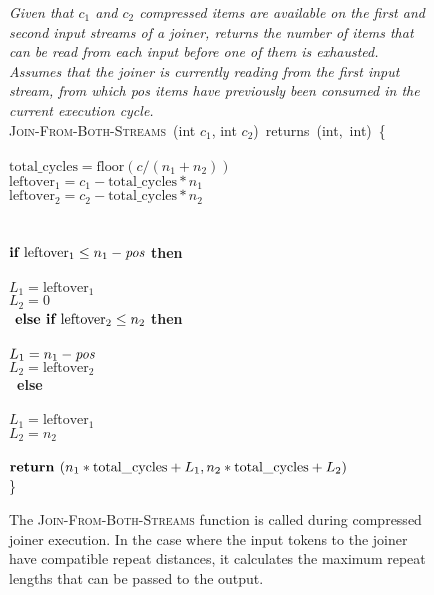 \begin{figure}[t!]
\centering
\begin{minipage}{0.75\textwidth}
{\it Given that $c_1$ and $c_2$ compressed items are available on the
  first and second input streams of a joiner, returns the number of
  items that can be read from each input before one of them is
  exhausted.  Assumes that the joiner is currently reading from the
  first input stream, from which \mbox{pos} items have previously been
  consumed in the current execution cycle.}\\
\textsc{Join-From-Both-Streams}~(int $c_1$, int $c_2$)~returns~(int,~int)~\{\\
\\
 $\mbox{total\_cycles} = \mbox{floor}(c/(n_1 + n_2))$\\
 $\mbox{leftover}_1 = c_1 - \mbox{total\_cycles} * n_1$\\
 $\mbox{leftover}_2 = c_2 - \mbox{total\_cycles} * n_2$\\
~ \\
\\
\tab$\mbox{\bf if~} \mbox{leftover}_1 \leq n_1 - \mbox{\it pos}$ {\bf then}\\
\tab{}\\
\tab\tab$L_1 = \mbox{leftover}_1$\\
\tab\tab$L_2 = 0$\\
\tab$\mbox{\bf~else if~} \mbox{leftover}_2 \leq n_2$ {\bf then}\\
\tab{}\\
\tab\tab$L_1 = n_1-\mbox{\it pos}$\\
\tab\tab$L_2 = \mbox{leftover}_2$\\
\tab\mbox{\bf ~else}\\
\tab{}\\
\tab\tab$L_1 = \mbox{leftover}_1$\\
\tab\tab$L_2 = n_2$\\
~ \\
\tab$\mbox{\bf return~}(n_1*\mbox{total\_cycles} + L_1, n_2*\mbox{total\_cycles} + L_2)$\\
\}
\end{minipage}
\caption[\textsc{Join-From-Both-Streams} function for compressed joiner
  execution.]{The \textsc{Join-From-Both-Streams} function is called during
  compressed joiner execution.  In the case where the input tokens to
  the joiner have compatible repeat distances, it calculates the
  maximum repeat lengths that can be passed to the
  output.\protect\label{fig:join-from-both-streams}}
\end{figure}

